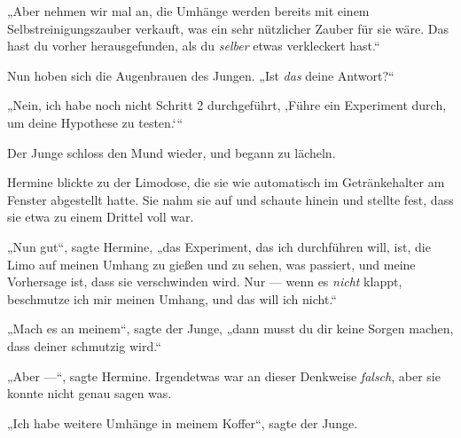 „Aber nehmen wir mal an, die Umhänge werden bereits mit einem Selbstreinigungszauber verkauft, was ein sehr nützlicher Zauber für sie wäre. Das hast du vorher herausgefunden, als du \emph{selber} etwas verkleckert hast.“

Nun hoben sich die Augenbrauen des Jungen.
„Ist \emph{das} deine Antwort?“

„Nein, ich habe noch nicht Schritt 2 durchgeführt, ‚Führe ein Experiment durch, um deine Hypothese zu testen.‘“

Der Junge schloss den Mund wieder, und begann zu lächeln.

Hermine blickte zu der Limodose, die sie wie automatisch im Getränkehalter am Fenster abgestellt hatte. Sie nahm sie auf und schaute hinein und stellte fest, dass sie etwa zu einem Drittel voll war.

„Nun gut“, sagte Hermine, „das Experiment, das ich durchführen will, ist, die Limo auf meinen Umhang zu gießen und zu sehen, was passiert, und meine Vorhersage ist, dass sie verschwinden wird. Nur — wenn es \emph{nicht} klappt, beschmutze ich mir meinen Umhang, und das will ich nicht.“

„Mach es an meinem“, sagte der Junge, „dann musst du dir keine Sorgen machen, dass deiner schmutzig wird.“

„Aber —“, sagte Hermine. Irgendetwas war an dieser Denkweise \emph{falsch}, aber sie konnte nicht genau sagen was.

„Ich habe weitere Umhänge in meinem Koffer“, sagte der Junge.

